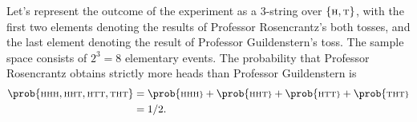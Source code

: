 Let's represent the outcome of the experiment as a 3-string over $\{{\scriptstyle\rm H},{\scriptstyle\rm T}\}$, with the first two elements denoting the results of Professor Rosencrantz's both tosses, and the last element denoting the result of Professor Guildenstern's toss.
The sample space consists of $2^3=8$ elementary events.
The probability that Professor Rosencrantz obtains strictly more heads than Professor Guildenstern is
\begin{align*}
    \prob{{\scriptstyle\rm HHH},{\scriptstyle\rm HHT},{\scriptstyle\rm HTT},{\scriptstyle\rm THT}} &= \prob{\scriptstyle\rm HHH}+\prob{\scriptstyle\rm HHT}+\prob{\scriptstyle\rm HTT}+\prob{\scriptstyle\rm THT} \\
    &= 1/2.
\end{align*}
